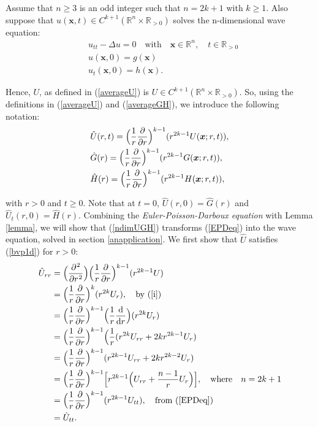 \documentclass[a4paper, 12pt]{article}
\numberwithin{equation}{section}
\begin{document}
Assume that $n \ge 3$ is an odd integer such that $n=2k+1$ with $k \ge 1$. Also
suppose that $u(\boldsymbol{x},t) \in C^{k+1}(\mathbb{R}^n \times \mathbb{R}_{>0})$
solves the n-dimensional wave equation:
\begin{equation} \label{ndimeq}
    \begin{aligned}
        &u_{tt}-\Delta u =0 \quad \textrm{with} \quad \boldsymbol{x} \in \mathbb{R}^n, \quad t \in \mathbb{R}_{>0}\\
        &u(\boldsymbol{x}, 0)=g(\boldsymbol{x})\\
        &u_t(\boldsymbol{x},0)=h(\boldsymbol{x}).
    \end{aligned}
\end{equation} 

Hence, $U$, as defined in (\ref{averageU}) is $U \in C^{k+1}(\mathbb{R}^n \times
\mathbb{R}_{>0})$. So, using the definitions in (\ref{averageU}) and
(\ref{averageGH}), we introduce the following notation:
\begin{equation} \label{ndimUGH}
    \begin{aligned}
        &\hat{U}(r,t)=\Big(\frac{1}{r} \diffp[1]{}{r} \Big)^{k-1} (r^{2k-1}U(\boldsymbol{x};r,t)),\\
        &\hat{G}(r)=\Big(\frac{1}{r} \diffp[1]{}{r} \Big)^{k-1} (r^{2k-1}G(\boldsymbol{x};r,t)),\\
        &\hat{H}(r)=\Big(\frac{1}{r} \diffp[1]{}{r} \Big)^{k-1} (r^{2k-1}H(\boldsymbol{x};r,t)),
    \end{aligned}
\end{equation}

with $r>0$ and $t \ge 0$. Note that at $t=0$, $\hat{U}(r,0)=\hat{G}(r)$ and
$\hat{U}_t(r,0)=\hat{H}(r)$. Combining the \emph{Euler-Poisson-Darboux equation} with
Lemma \ref{lemma}, we will show that (\ref{ndimUGH}) transforms (\ref{EPDeq})
into the wave equation, solved in section \ref{anapplication}. We first show
that $\hat{U}$ satisfies (\ref{bvp1d}) for $r>0$:
\begin{equation*}
    \begin{aligned}
        \hat{U}_{rr}&=\Big(\diffp[2]{}{r}\Big)\Big(\frac{1}{r} \diffp[1]{}{r}\Big)^{k-1}(r^{2k-1}U)\\
        &=\Big(\frac{1}{r} \diffp[1]{}{r}\Big)^k(r^{2k}U_r), \quad \textrm{by (\ref{i})}\\
        &=\Big(\frac{1}{r} \diffp[1]{}{r}\Big)^{k-1}\Big(\frac{1}{r}\diff{}{r}\Big)(r^{2k}U_r)\\
        &=\Big(\frac{1}{r} \diffp[1]{}{r}\Big)^{k-1}\Big(\frac{1}{r}(r^{2k}U_{rr}+2kr^{2k-1}U_r)\\
        &=\Big(\frac{1}{r} \diffp[1]{}{r}\Big)^{k-1}(r^{2k-1}U_{rr}+2kr^{2k-2}U_r)\\
        &=\Big(\frac{1}{r} \diffp[1]{}{r}\Big)^{k-1}\Big[r^{2k-1}\Big(U_{rr}+\frac{n-1}{r}U_r\Big)\Big], \quad \textrm{where} \quad n=2k+1\\
        &=\Big(\frac{1}{r} \diffp[1]{}{r}\Big)^{k-1}(r^{2k-1}U_{tt}), \quad \textrm{from (\ref{EPDeq})}\\
        &=\hat{U}_{tt}.
    \end{aligned}
\end{equation*}
\end{document}
